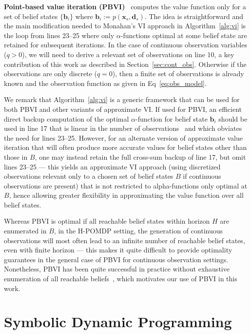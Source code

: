 \documentclass{article} %
\renewcommand{\vec}[1]{\mathbf{#1}} %
\newcommand{\xds}{\mathbf{x}_s,\!\mathbf{d}_s}
\begin{document}
\textbf{Point-based value iteration (PBVI)}~\cite{pbvi_jair06,Perseus} 
computes the value
function only for a set of belief states $\{ \vec{b}_i \}$ where
$\vec{b}_i := p(\xds)$.  The idea is straightforward and the main
modification needed to Monahan's VI approach in Algorithm~\ref{alg:vi}
is the loop from lines 23--25 where
only $\alpha$-functions optimal at some belief state are retained for
subsequent iterations.
In the case of continuous observation
variables ($q > 0$), we will need to derive a relevant set of
observations on line 10, a key contribution of this work as described
in Section~\ref{sec:cont_obs}.  Otherwise if the observations are only 
discrete ($q=0$), then a finite set of observations is already known and
the observation function as given in Eq~\eqref{eq:obs_model}.

We remark that Algorithm~\ref{alg:vi} is a generic framework that 
can be used for both PBVI and other variants of 
approximate VI.  If used for PBVI, an 
efficient direct backup computation of the optimal $\alpha$-function for belief 
state $\vec{b}_i$ should be used in line 17 
that is linear in the number of observations~\cite{pbvi_jair06,Perseus}
and which obviates the need for lines 23--25.  
However, for an alternate version of approximate value iteration that will often
produce more accurate values for belief states other than those in $B$, 
one may instead retain the full cross-sum backup
of line 17, but omit lines 23--25 --- 
this yields an approximate VI approach 
(using discretized observations 
relevant only to a chosen set of belief states $B$ if continuous observations
are present) that is not restricted to alpha-functions only optimal at $B$, 
hence allowing greater flexibility
in approximating the value function over all belief states.%

Whereas PBVI is optimal if all reachable belief states within horizon
$H$ are enumerated in $B$, in the H-POMDP setting, the generation of
continuous observations will most often lead to an infinite number of
reachable belief states, even with finite horizon --- this makes
it quite difficult to provide optimality guarantees in the general case of PBVI
for continuous observation settings.  Nonetheless, PBVI has been quite
successful in practice without exhaustive enumeration of all reachable
beliefs~\cite{pbvi_jair06,hsvi2,Perseus,gapmin}, which motivates our
use of PBVI in this work.

\section{Symbolic Dynamic Programming} 
\end{document}
